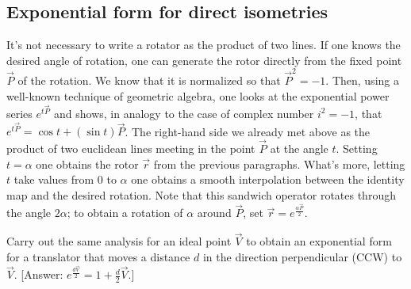 \documentclass{birkjour}
\newcommand{\mydogblue}{{\color{gray} $\square$~~}}
\begin{document}
{\subsection{Exponential form for direct isometries}

It's not necessary to write a rotator as the product of two lines.  If one knows the desired angle of rotation, one can generate the rotor directly from the fixed point $\vec{P}$ of the rotation.   We know that it is normalized so that $\vec{P}^{2}=-1$.  Then, using a well-known technique of geometric algebra, one looks at the exponential power series $e^{t\vec{P}}$ and shows, in analogy to the case of complex number $i^{2}=-1$, that $e^{t\vec{P}} = \cos{t} + (\sin{t}) \vec{P}$. The right-hand side we already met above as the product of two euclidean lines meeting in the point $\vec{P}$ at the angle $t$.  Setting $t=\alpha$ one obtains the rotor $\vec{r}$ from the previous paragraphs.  What's more, letting $t$ take values from $0$ to $\alpha$ one obtains a smooth interpolation between the identity map and the desired rotation. Note that this sandwich operator rotates through the angle $2 \alpha$; to obtain a rotation of $\alpha$ around $\vec{P}$, set $\vec{r} = e^{\frac{\alpha \vec{P}}{2}}$. 

\myexercise  Carry out the same analysis for an ideal point $\vec{V}$ to obtain an exponential form for a translator that moves a distance $d$ in the direction perpendicular (CCW) to $\vec{V}$. [Answer: $e^{\frac{d \vec{V}}{2}} = 1+\frac{d}{2}\vec{V}$.] %
}
\end{document}
